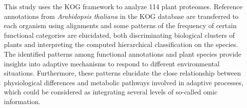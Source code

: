 This study uses the KOG framework to analyze 114 plant 
proteomes. 
Reference annotations from \emph{Arabidopsis 
thaliana} in the KOG database are transferred to each 
organism using alignments and some patterns of the frequency of
certain functional categories are elucidated, both discriminating 
biological clusters of plants and interpreting the computed 
hierarchical classification on the species.
The identified patterns among functional annotations and 
plant species provide insights into adaptive 
mechanisms to respond to different environmental 
situations. Furthermore, these patterns elucidate the close 
relationship between physiological differences and metabolic 
pathways involved in adaptive processes, which could be 
considered as integrating several levels of so-called 
omic information.
